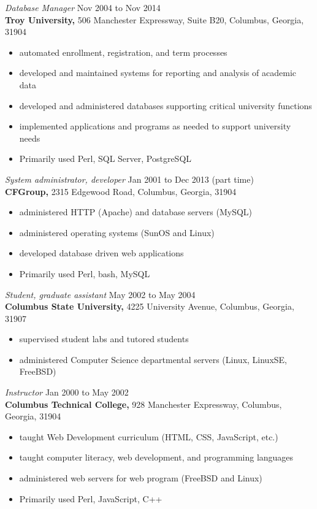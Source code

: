\documentclass[margin, 10pt]{res} %
\begin{document}
\begin{resume}
{\it Database Manager} \hfill Nov 2004 to Nov 2014 \\
\textbf{Troy University,} 506 Manchester Expressway, Suite B20, Columbus, Georgia, 31904
\begin{itemize} \itemsep -2pt %
\item automated enrollment, registration, and term processes
\item developed and maintained systems for reporting and analysis of academic data
\item developed and administered databases supporting critical university functions 
\item implemented applications and programs as needed to support university needs 
\item Primarily used Perl, SQL Server, PostgreSQL
\end{itemize}
 
{\it System administrator, developer} \hfill Jan 2001 to Dec 2013 (part time) \\
\textbf{CFGroup,} \hfill 2315 Edgewood Road, Columbus, Georgia, 31904
\begin{itemize} \itemsep -2pt %
\item administered HTTP (Apache) and database servers (MySQL)
\item administered operating systems (SunOS and Linux)
\item developed database driven web applications
\item Primarily used Perl, bash, MySQL
\end{itemize}
 
{\it Student, graduate assistant} \hfill May 2002 to May 2004 \\
\textbf{Columbus State University,} \hfill 4225 University Avenue, Columbus, Georgia, 31907

\begin{itemize} \itemsep -2pt %
\item supervised student labs and tutored students
\item administered Computer Science departmental servers (Linux, LinuxSE, FreeBSD)
\end{itemize}

{\it Instructor} \hfill Jan 2000 to May 2002 \\
\textbf{Columbus Technical College,} \hfill 928 Manchester Expressway, Columbus, Georgia, 31904
\begin{itemize} \itemsep -2pt %
        \item taught Web Development curriculum (HTML, CSS, JavaScript, etc.)
\item taught computer literacy, web development, and programming languages
\item administered web servers for web program (FreeBSD and Linux)
\item Primarily used Perl, JavaScript, C++
\end{itemize}


\end{resume}
\end{document}
